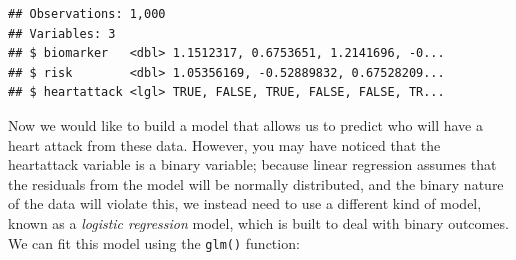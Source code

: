 \documentclass[12pt,]{book}
\newenvironment{Shaded}{\begin{snugshade}}{\end{snugshade}}
\newcommand{\CommentTok}[1]{\textcolor[rgb]{0.56,0.35,0.01}{\textit{#1}}}
\newcommand{\DataTypeTok}[1]{\textcolor[rgb]{0.13,0.29,0.53}{#1}}
\newcommand{\DecValTok}[1]{\textcolor[rgb]{0.00,0.00,0.81}{#1}}
\newcommand{\FloatTok}[1]{\textcolor[rgb]{0.00,0.00,0.81}{#1}}
\newcommand{\KeywordTok}[1]{\textcolor[rgb]{0.13,0.29,0.53}{\textbf{#1}}}
\newcommand{\NormalTok}[1]{#1}
\newcommand{\OperatorTok}[1]{\textcolor[rgb]{0.81,0.36,0.00}{\textbf{#1}}}
\newcommand{\StringTok}[1]{\textcolor[rgb]{0.31,0.60,0.02}{#1}}
\begin{document}
\begin{Shaded}
\end{Shaded}

\begin{verbatim}
## Observations: 1,000
## Variables: 3
## $ biomarker   <dbl> 1.1512317, 0.6753651, 1.2141696, -0...
## $ risk        <dbl> 1.05356169, -0.52889832, 0.67528209...
## $ heartattack <lgl> TRUE, FALSE, TRUE, FALSE, FALSE, TR...
\end{verbatim}

Now we would like to build a model that allows us to predict who will have a heart attack from these data. However, you may have noticed that the heartattack variable is a binary variable; because linear regression assumes that the residuals from the model will be normally distributed, and the binary nature of the data will violate this, we instead need to use a different kind of model, known as a \emph{logistic regression} model, which is built to deal with binary outcomes. We can fit this model using the \texttt{glm()} function:
\end{document}
